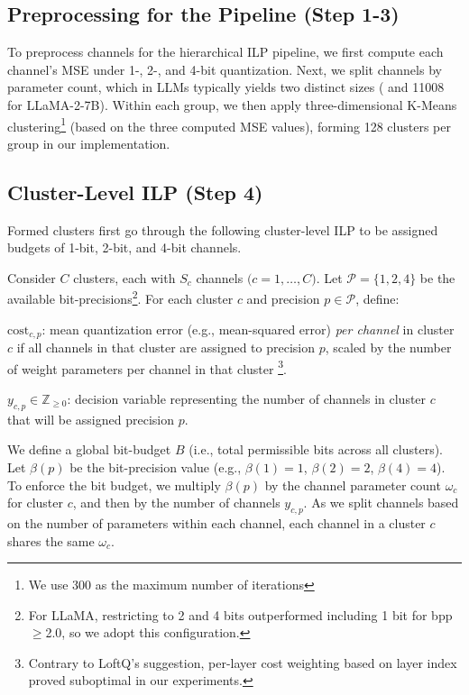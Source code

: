 \subsection{Preprocessing for the Pipeline (Step 1-3)}

To preprocess channels for the hierarchical ILP pipeline, we first compute each channel’s MSE under 1-, 2-, and 4-bit quantization. Next, we split channels by parameter count, which in LLMs typically yields two distinct sizes ( and 11008 for LLaMA-2-7B). Within each group, we then apply three-dimensional K-Means clustering\footnote{We use 300 as the maximum number of iterations} (based on the three computed MSE values), forming 128 clusters per group in our implementation.


\subsection{Cluster-Level ILP (Step 4)}
Formed clusters first go through the following cluster-level ILP to be assigned budgets of 1-bit, 2-bit, and 4-bit channels.

Consider \(C\) clusters, each with \(S_c\) channels \(\bigl(c = 1,\dots,C\bigr)\). Let \(\mathcal{P} = \{1,2,4\}\) be the available bit-precisions\footnote{For LLaMA, restricting to 2 and 4 bits outperformed including 1 bit for bpp $\geq$2.0, so we adopt this configuration.}. For each cluster \(c\) and precision \(p \in \mathcal{P}\), define:
\begin{packeditemize}
    \item \(\text{cost}_{c,p}\): mean quantization error (e.g., mean-squared error) \emph{per channel} in cluster \(c\) if all channels in that cluster are assigned to precision \(p\), scaled by the number of weight parameters per channel in that cluster \footnote{Contrary to LoftQ’s suggestion, per-layer cost weighting based on layer index proved suboptimal in our experiments.}.
    \item \(y_{c,p} \in \mathbb{Z}_{\ge 0}\): decision variable representing the number of channels in cluster \(c\) that will be assigned precision \(p\).
\end{packeditemize}

We define a global bit-budget \(B\) (i.e., total permissible bits across all clusters). 
Let \(\beta(p)\) be the bit-precision value (e.g., \(\beta(1)=1\), \(\beta(2)=2\), \(\beta(4)=4\)). 
To enforce the bit budget, we multiply \(\beta(p)\) by the channel parameter count \(\omega_c\) for cluster \(c\), and then by the number of channels \(y_{c,p}\). As we split channels based on the number of parameters within each channel, each channel in a cluster \(c\) shares the same \(\omega_c\). 

